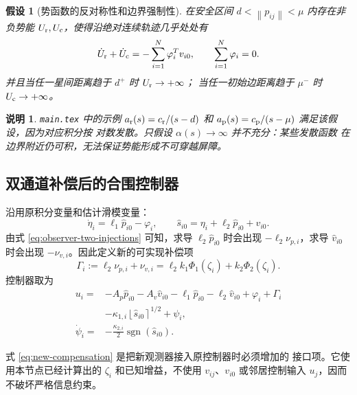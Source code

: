\documentclass[UTF8,a4paper,12pt]{ctexart}
\newtheorem{assumption}{假设}
\newtheorem{remark}{说明}
\newcommand{\sgn}{\operatorname{sgn}}
\newcommand{\norm}[1]{\left\lVert #1\right\rVert}
\newcommand{\ipow}[2]{\left\lfloor #1\right\rceil^{#2}}
\begin{document}
\begin{assumption}[势函数的反对称性和边界强制性]
\label{ass:barrier-potential}
在安全区间 $d<\norm{p_{ij}}<\mu$ 内存在非负势能
$U_{\rm r},U_{\rm c}$，使得沿绝对连续轨迹几乎处处有
\begin{equation}
 \dot U_{\rm r}+\dot U_{\rm c}
 =-\sum_{i=1}^N\varphi_i^Tv_{i0},\qquad
 \sum_{i=1}^N\varphi_i=0.
 \label{eq:apf-required-properties}
\end{equation}
并且当任一星间距离趋于 $d^+$ 时 $U_{\rm r}\to+\infty$；
当任一初始边距离趋于 $\mu^-$ 时 $U_{\rm c}\to+\infty$。
\end{assumption}

\begin{remark}
\texttt{main.tex} 中的示例
$a_{\rm r}(s)=c_{\rm r}/(s-d)$ 和
$a_{\rm p}(s)=c_{\rm p}/(s-\mu)$ 满足该假设，因为对应积分按
对数发散。只假设 $\alpha(s)\to\infty$ 并不充分：某些发散函数
在边界附近仍可积，无法保证势能形成不可穿越屏障。
\end{remark}

\subsection{双通道补偿后的合围控制器}

沿用原积分变量和估计滑模变量：
\begin{equation}
  \dot\eta_i=\ell_1\hat p_{i0}-\varphi_i,\qquad
  \hat s_{i0}=\eta_i+\ell_2\hat p_{i0}+\hat v_{i0}.
  \label{eq:new-sliding-variable}
\end{equation}
由式 \eqref{eq:observer-two-injections} 可知，求导
$\ell_2\hat p_{i0}$ 时会出现 $-\ell_2\nu_{p,i}$，求导
$\hat v_{i0}$ 时会出现 $-\nu_{v,i}$。因此定义新的可实现补偿项
\begin{equation}
 \boxed{\Gamma_i:=\ell_2\nu_{p,i}+\nu_{v,i}
 =\ell_2k_1\Phi_1(\zeta_i)+k_2\Phi_2(\zeta_i).}
 \label{eq:new-compensation}
\end{equation}
控制器取为
\begin{equation}
\begin{aligned}
 u_i={}&-A_p\hat p_{i0}-A_v\hat v_{i0}
 -\ell_1\hat p_{i0}-\ell_2\hat v_{i0}+\varphi_i+\Gamma_i\\
 &-\kappa_{1,i}\ipow{\hat s_{i0}}{1/2}+\psi_i,\\
 \dot\psi_i={}&-\frac{\kappa_{2,i}}{2}\sgn(\hat s_{i0}).
\end{aligned}
\label{eq:new-controller}
\end{equation}

\begin{auditbox}
式 \eqref{eq:new-compensation} 是把新观测器接入原控制器时必须增加的
接口项。它使用本节点已经计算出的 $\zeta_i$ 和已知增益，不使用
$v_{ij}$、$v_{i0}$ 或邻居控制输入 $u_j$，因而不破坏严格信息约束。
\end{auditbox}
\end{document}

